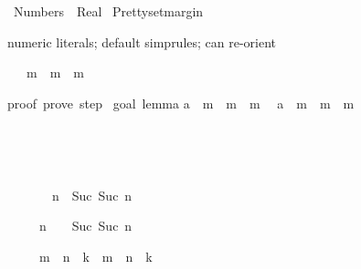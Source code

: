 %
\begin{isabellebody}%
\def\isabellecontext{Numbers}%
\isanewline
{}\ Numbers\ {\isacharequal}\ Real{\isacharcolon}\isanewline
\isanewline
{}\ {\isachardoublequote}Pretty{\isachardot}setmargin\ {}{}{\isachardoublequote}%
\begin{isamarkuptext}%
numeric literals; default simprules; can re-orient%
\end{isamarkuptext}%
\ {\isachardoublequote}{\isacharhash}{}\ {\isacharasterisk}\ m\ {\isacharequal}\ m\ {\isacharplus}\ m{\isachardoublequote}\isanewline
{}%
\begin{isamarkuptext}%
proof\ {\isacharparenleft}prove{\isacharparenright}{\isacharcolon}\ step\ {}\isanewline
\isanewline
goal\ {\isacharparenleft}lemma{\isacharparenright}{\isacharcolon}\isanewline
{\isacharparenleft}{\isacharhash}{}{\isasymColon}{\isacharprime}a{\isacharparenright}\ {\isacharasterisk}\ m\ {\isacharequal}\ m\ {\isacharplus}\ m\isanewline
\ {}{\isachardot}\ {\isacharparenleft}{\isacharhash}{}{\isasymColon}{\isacharprime}a{\isacharparenright}\ {\isacharasterisk}\ m\ {\isacharequal}\ m\ {\isacharplus}\ m


\begin{isabelle}%
\ \ \ \ \ {\isacharhash}{}\ {\isacharequal}\ {}%
\end{isabelle}

\begin{isabelle}%
\ \ \ \ \ {\isacharhash}{}\ {\isacharequal}\ {}%
\end{isabelle}

\begin{isabelle}%
\ \ \ \ \ {\isacharhash}{}\ {\isacharplus}\ n\ {\isacharequal}\ Suc\ {\isacharparenleft}Suc\ n{\isacharparenright}%
\end{isabelle}

\begin{isabelle}%
\ \ \ \ \ n\ {\isacharplus}\ {\isacharhash}{}\ {\isacharequal}\ Suc\ {\isacharparenleft}Suc\ n{\isacharparenright}%
\end{isabelle}

\begin{isabelle}%
\ \ \ \ \ m\ {\isacharplus}\ n\ {\isacharplus}\ k\ {\isacharequal}\ m\ {\isacharplus}\ {\isacharparenleft}n\ {\isacharplus}\ k{\isacharparenright}%
\end{isabelle}


\end{isamarkuptext}
\end{isabellebody}
